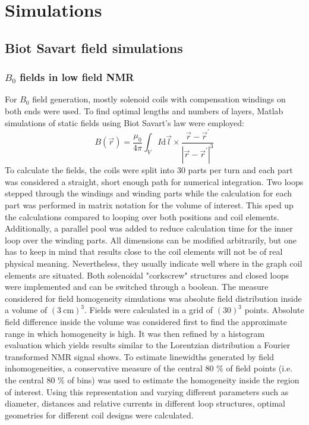 \chapter{Simulations}\label{chapter:simulations}
\section{Biot Savart field simulations}
\subsection{$B_0$ fields in low field NMR}\label{simulations:B0}
        For $B_0$ field generation, mostly solenoid coils with compensation windings on both ends were used. To find optimal lengths and numbers of layers, Matlab simulations of static fields using Biot Savart's law were employed:
        \begin{equation}
            B(\vec r) = \frac{\mu_0}{4\pi} \int_V I\mathrm{d} \vec l \times \frac{\vec r - \vec r^{'}}{\left|\vec r - \vec r^{'}\right|^3}
        \end{equation}
        To calculate the fields, the coils were split into 30 parts per turn and each part was considered a straight, short enough path for numerical integration. Two loops stepped through the windings and winding parts while the calculation for each part was performed in matrix notation for the volume of interest. This sped up the calculations compared to looping over both positions and coil elements. Additionally, a parallel pool was added to reduce calculation time for the inner loop over the winding parts.
        All dimensions can be modified arbitrarily, but one has to keep in mind that results close to the coil elements will not be of real physical meaning. Nevertheless, they usually indicate well where in the graph coil elements are situated.  Both solenoidal "corkscrew" structures and closed loops were implemented and can be switched through a boolean. The measure considered for field homogeneity simulations was absolute field distribution inside a volume of $(\SI{3}{\centi\meter})^3$. Fields were calculated in a grid of $(30)^3$ points. Absolute field difference inside the volume was considered first to find the approximate range in which homogeneity is high. It was then refined by a histogram evaluation which yields results similar to the Lorentzian distribution a Fourier transformed NMR signal shows. To estimate linewidths generated by field inhomogeneities, a conservative measure of the central 80 \% of field points (i.e. the central 80 \% of bins) was used to estimate the homogeneity inside the region of interest.  Using this representation and varying different parameters such as diameter, distances and relative currents in different loop structures, optimal geometries for different coil designs were calculated.
